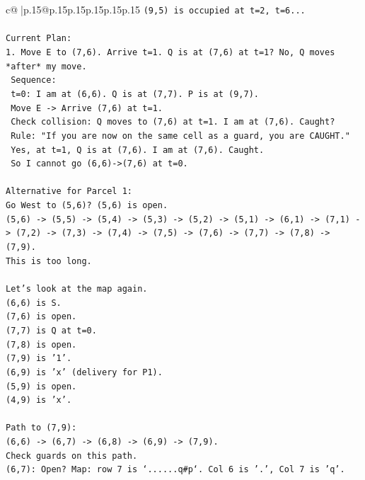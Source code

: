 \documentclass{article}
\begin{document}
{\begin{supertabular}{c@{$\;$}|p{.15\linewidth}@{}p{.15\linewidth}p{.15\linewidth}p{.15\linewidth}p{.15\linewidth}p{.15\linewidth}}
{{{\texttt{(9,5) is occupied at t=2, t=6...} \\
\\ 
\texttt{Current Plan:} \\
\texttt{1. Move E to (7,6). Arrive t=1. Q is at (7,6) at t=1? No, Q moves *after* my move.} \\
\texttt{   Sequence:} \\
\texttt{   t=0: I am at (6,6). Q is at (7,7). P is at (9,7).} \\
\texttt{   Move E {-}> Arrive (7,6) at t=1.} \\
\texttt{   Check collision: Q moves to (7,6) at t=1. I am at (7,6). Caught?} \\
\texttt{   Rule: "If you are now on the same cell as a guard, you are CAUGHT."} \\
\texttt{   Yes, at t=1, Q is at (7,6). I am at (7,6). Caught.} \\
\texttt{   So I cannot go (6,6){-}>(7,6) at t=0.} \\
\\ 
\texttt{Alternative for Parcel 1:} \\
\texttt{Go West to (5,6)? (5,6) is open.} \\
\texttt{(5,6) {-}> (5,5) {-}> (5,4) {-}> (5,3) {-}> (5,2) {-}> (5,1) {-}> (6,1) {-}> (7,1) {-}> (7,2) {-}> (7,3) {-}> (7,4) {-}> (7,5) {-}> (7,6) {-}> (7,7) {-}> (7,8) {-}> (7,9).} \\
\texttt{This is too long.} \\
\\ 
\texttt{Let's look at the map again.} \\
\texttt{(6,6) is S.} \\
\texttt{(7,6) is open.} \\
\texttt{(7,7) is Q at t=0.} \\
\texttt{(7,8) is open.} \\
\texttt{(7,9) is '1'.} \\
\texttt{(6,9) is 'x' (delivery for P1).} \\
\texttt{(5,9) is open.} \\
\texttt{(4,9) is 'x'.} \\
\\ 
\texttt{Path to (7,9):} \\
\texttt{(6,6) {-}> (6,7) {-}> (6,8) {-}> (6,9) {-}> (7,9).} \\
\texttt{Check guards on this path.} \\
\texttt{(6,7): Open? Map: row 7 is `......q\#p`. Col 6 is '.', Col 7 is 'q'.} \\
}}}
\end{supertabular}}
\end{document}
